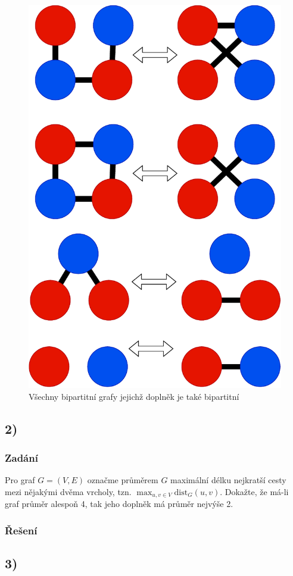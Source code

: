 \documentclass[../main.tex]{subfiles}
\begin{document}
\begin{figure}[!h]
    \centering
    \includegraphics[height=\linewidth]{images/BipartiteComplement.pdf}
    \caption*{Všechny bipartitní grafy jejichž doplněk je také bipartitní}
\end{figure}






\subsection{2)}
\subsubsection*{Zadání}
Pro graf $G=(V,E)$ označme průměrem $G$ maximální délku nejkratší cesty mezi nějakými dvěma vrcholy, tzn. $\max_{u,v\in V} \text{dist}_{G}(u,v)$. Dokažte, že má-li graf průměr alespoň 4, tak jeho doplněk má průměr nejvýše 2.

\subsubsection*{Řešení}


\subsection{3)}
\end{document}
